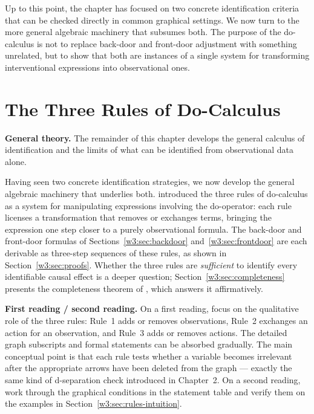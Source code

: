 \documentclass[master.tex]{subfiles}
\begin{document}
\medskip\noindent
Up to this point, the chapter has focused on two concrete identification
criteria that can be checked directly in common graphical settings.
We now turn to the more general algebraic machinery that subsumes both.
The purpose of the do-calculus is not to replace back-door and front-door
adjustment with something unrelated, but to show that both are instances
of a single system for transforming interventional expressions into
observational ones.

\section{The Three Rules of Do-Calculus}
\label{w3:sec:rules}

\noindent\textbf{General theory.}\enspace
The remainder of this chapter develops the general calculus of
identification and the limits of what can be identified from observational
data alone.

\medskip
Having seen two concrete identification strategies, we now develop the
general algebraic machinery that underlies both.  \citet{pearl1995causal}
introduced the three rules of do-calculus as a system for manipulating
expressions involving the do-operator: each rule licenses a transformation
that removes or exchanges terms, bringing the expression one step closer
to a purely observational formula.  The back-door and front-door formulas
of Sections~\ref{w3:sec:backdoor} and~\ref{w3:sec:frontdoor} are each
derivable as three-step sequences of these rules, as shown in
Section~\ref{w3:sec:proofs}.  Whether the three rules are
\emph{sufficient} to identify every identifiable causal effect is a deeper
question; Section~\ref{w3:sec:completeness} presents the completeness
theorem of \citet{shpitser2006identification}, which answers it
affirmatively.

\begin{remark}
\textbf{First reading / second reading.}
On a first reading, focus on the qualitative role of the three rules:
Rule~1 adds or removes observations, Rule~2 exchanges an action for an
observation, and Rule~3 adds or removes actions.
The detailed graph subscripts and formal statements can be absorbed
gradually.
The main conceptual point is that each rule tests whether a variable
becomes irrelevant after the appropriate arrows have been deleted from
the graph --- exactly the same kind of d-separation check introduced in
Chapter~2.
On a second reading, work through the graphical conditions in the
statement table and verify them on the examples in
Section~\ref{w3:sec:rules-intuition}.
\end{remark}
\end{document}
